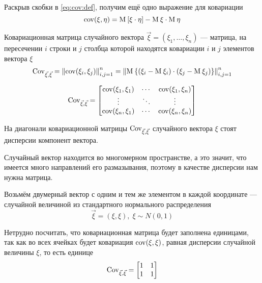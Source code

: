 Раскрыв скобки в \eqref{eq:cov:def}, получим ещё одно выражение для
ковариации
\begin{equation*}
  \operatorname{cov}\!\left( \xi, \eta \right) = \operatorname{M}_{} \left[ \xi \cdot \eta \right] - \operatorname{M}_{} \xi \cdot \operatorname{M}_{} \eta
\end{equation*}

\begin{definition}
  \label{def:vectorCovMatrix}

  Ковариационная матрица случайного вектора
  $\vec{\xi} = \left( \xi_1, \dots, \xi_n \right)$ --- матрица, на пересечении
  $i$ строки и $j$ столбца которой находятся ковариации $i$ и $j$ элементов
  вектора $\xi$
  $$\operatorname{Cov}^{}_{\vec{\xi}, \vec{\xi}}
      = \left\| \operatorname{cov}\!\left( \xi_i, \xi_j \right) \right\|_{i,j=1}^n
      = \left\| \operatorname{M}_{} 
      \left\{ \left( \xi_i - \operatorname{M}_{} \xi_i \right)
          \cdot \left( \xi_j - \operatorname{M}_{} \xi_j \right)
      \right\} \right\|_{i,j=1}^n$$

  $$\operatorname{Cov}^{}_{\vec{\xi}, \vec{\xi}} =
  \begin{bmatrix}
      \operatorname{cov}\!\left( \xi_1, \xi_1 \right) & \cdots & \operatorname{cov}\!\left( \xi_1, \xi_n \right) \\
      \vdots & \ddots & \vdots \\
      \operatorname{cov}\!\left( \xi_n, \xi_1 \right) & \cdots & \operatorname{cov}\!\left( \xi_n, \xi_n \right)
  \end{bmatrix}$$

\end{definition}

\begin{remark}
  На диагонали ковариационной матрицы $\operatorname{Cov}^{}_{\vec{\xi}, \vec{\xi}}$
  случайного вектора $\xi$ стоят дисперсии компонент вектора.
\end{remark}

Случайный вектор находится во многомерном пространстве, а это значит,
что имеется много направлений его размазывания, поэтому в качестве дисперсии
нам нужна матрица.

\begin{example}
  Возьмём двумерный вектор с одним и тем же элементом
  в каждой координате --- случайной величиной из стандартного нормального
  распределения
  $$\vec{\xi} = \left( \xi, \xi \right),\; \xi \sim N\left( 0, 1 \right)$$

  Нетрудно посчитать, что ковариационная матрица будет заполнена единицами,
  так как во всех ячейках будет ковариация $\operatorname{cov}\!\left( \xi, \xi \right)$, равная
  дисперсии случайной величины $\xi$, то есть единице
  $$\operatorname{Cov}^{}_{\vec{\xi}, \vec{\xi}} =
  \begin{bmatrix}
      1 & 1 \\
      1 & 1
  \end{bmatrix}$$
\end{example}

